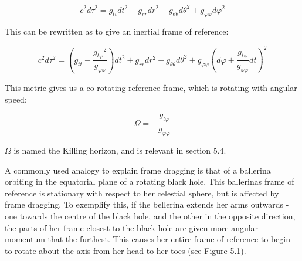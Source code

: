 \documentclass[oneside,openright,frontopenright, singlespacing]{dmathesis}
\begin{document}
	\[c^2d\tau^2 = g_{tt}dt^2+g_{rr}dr^2+g_{\theta\theta}d\theta^2+g_{\varphi\varphi}d\varphi^2\]

\vspace{1em}
	This can be rewritten as \cite{kerrMetric} to give an inertial frame of reference:

	\[c^2d\tau^2 = \left(g_{tt}-\frac{{g_{t\varphi}}^2}{g_{\varphi\varphi}}\right)dt^2+g_{rr}dr^2+g_{\theta\theta}d\theta^2+g_{\varphi\varphi}\left(d\varphi+\frac{g_{t\varphi}}{g_{\varphi\varphi}}dt\right)^2\]

\vspace{1em}
	This metric gives us a co-rotating reference frame, which is rotating with angular speed:

	\[\Omega = -\frac{g_{t\varphi}}{g_{\varphi\varphi}}\]

\vspace{1em}
	$\Omega$ is named the Killing horizon, and is relevant in section 5.4.

\vspace{1em}
	A commonly used analogy to explain frame dragging is that of a ballerina orbiting in the equatorial plane of a rotating black hole. This ballerinas frame of reference is stationary with respect to her celestial sphere, but is affected by frame dragging. To exemplify this, if the bellerina extends her arms outwards - one towards the centre of the black hole, and the other in the opposite direction, the parts of her frame closest to the black hole are given more angular momentum that the furthest. This causes her entire frame of reference to begin to rotate about the axis from her head to her toes (see Figure 5.1).
\end{document}
